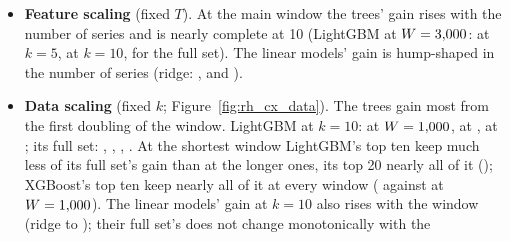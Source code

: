 \begin{itemize}
\begin{itemize}
    $T$); ridge, lasso and elastic net on each window's own frozen penalty (ridge \rhcxPenRidgeOne{} at $W =
    \rhcxWOne$, \rhcxPenRidgeMain{} at the other windows; lasso \rhcxPenLassoOne{} and \rhcxPenLassoMain; elastic net
    \rhcxPenEnetOne{} and \rhcxPenEnetMain).
  \item Each rung is refitted at the \rhcxNOrigins{} monthly origins of Appendix~\ref{app:rh_fi_compute} and held for
    the next \rhfipOriginEvery{} trading days. The full rung equals the every-bar walk at every origin
    (\rhcxNGatesPass{} of \rhcxNGates{} window--model gates).
  \item Gain $G(W, k)$: the QLIKE of the same window's $k = 0$ rung minus the rung's, $\times 10^3$, on the
    \rhcxNBars{} scored bars of Table~\ref{tab:rh_oos} and on the 16:00 bar; Diebold--Mariano tests against $k = 0$
    (HLN, Newey--West lag \rhcxHacLag). Figures~\ref{fig:rh_cx_features} and~\ref{fig:rh_cx_data}.
  \end{itemize}
\item \textbf{Feature scaling} (fixed $T$). At the main window the trees' gain rises with the number of series and
  is nearly complete at 10 (LightGBM at $W = 3{,}000$: \rhcxGainLgbmBarMainFive{} at $k = 5$,
  \rhcxGainLgbmBarMainTen{} at $k = 10$, \rhcxGainLgbmBarMainFull{} for the full set). The linear models' gain is
  hump-shaped in the number of series (ridge: \rhcxGainRidgeBarMainFive, \rhcxGainRidgeBarMainTen{} and
  \rhcxGainRidgeBarMainFull).
\item \textbf{Data scaling} (fixed $k$; Figure~\ref{fig:rh_cx_data}). The trees gain most from the first doubling
  of the window. LightGBM at $k = 10$: \rhcxGainLgbmBarOneTen{} at $W = \rhcxWOne$, \rhcxGainLgbmBarTwoTen{} at
  \rhcxWTwo, \rhcxGainLgbmBarLongTen{} at \rhcxWLong; its full set: \rhcxGainLgbmBarOneFull, \rhcxGainLgbmBarTwoFull,
  \rhcxGainLgbmBarMainFull, \rhcxGainLgbmBarLongFull. At the shortest window LightGBM's top ten keep much less of its
  full set's gain than at the longer ones, its top 20 nearly all of it (\rhcxGainLgbmBarOneTwenty); XGBoost's top ten
  keep nearly all of it at every window (\rhcxGainXgbBarOneTen{} against \rhcxGainXgbBarOneFull{} at $W =
  \rhcxWOne$). The linear models' gain at $k = 10$ also rises with the window (ridge
  \rhcxGainRidgeBarOneTen{} to \rhcxGainRidgeBarLongTen); their full set's does not change monotonically with the

\end{itemize}
